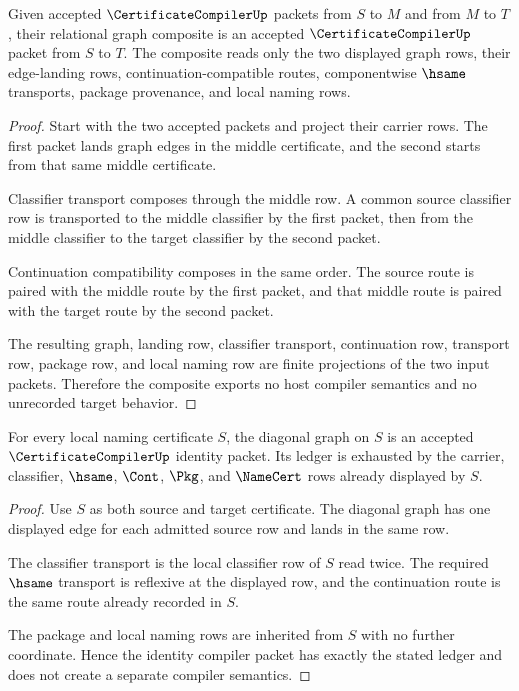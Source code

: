 \begin{theorem}
\label{thm:certificate-compiler-composition-stability}
Given accepted $\CertificateCompilerUp$ packets from $S$ to $M$ and from $M$
to $T$, their relational graph composite is an accepted
$\CertificateCompilerUp$ packet from $S$ to $T$. The composite reads only the
two displayed graph rows, their edge-landing rows, continuation-compatible
routes, componentwise $\hsame$ transports, package provenance, and local
naming rows.
\end{theorem}
\begin{proof}
Start with the two accepted packets and project their carrier rows. The first
packet lands graph edges in the middle certificate, and the second starts from
that same middle certificate.

Classifier transport composes through the middle row. A common source
classifier row is transported to the middle classifier by the first packet,
then from the middle classifier to the target classifier by the second packet.

Continuation compatibility composes in the same order. The source route is
paired with the middle route by the first packet, and that middle route is
paired with the target route by the second packet.

The resulting graph, landing row, classifier transport, continuation row,
transport row, package row, and local naming row are finite projections of the
two input packets. Therefore the composite exports no host compiler semantics
and no unrecorded target behavior.
\end{proof}

\begin{theorem}
\label{thm:certificate-compiler-identity-ledger}
For every local naming certificate $S$, the diagonal graph on $S$ is an
accepted $\CertificateCompilerUp$ identity packet. Its ledger is exhausted by
the carrier, classifier, $\hsame$, $\Cont$, $\Pkg$, and $\NameCert$ rows
already displayed by $S$.
\end{theorem}
\begin{proof}
Use $S$ as both source and target certificate. The diagonal graph has one
displayed edge for each admitted source row and lands in the same row.

The classifier transport is the local classifier row of $S$ read twice. The
required $\hsame$ transport is reflexive at the displayed row, and the
continuation route is the same route already recorded in $S$.

The package and local naming rows are inherited from $S$ with no further
coordinate. Hence the identity compiler packet has exactly the stated ledger
and does not create a separate compiler semantics.
\end{proof}

